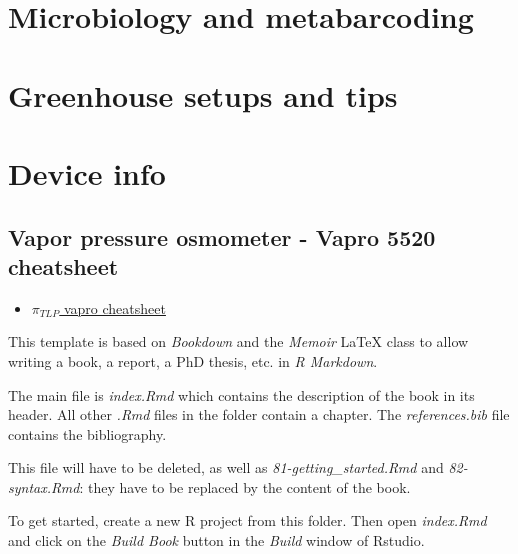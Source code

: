 \documentclass[
  12pt,
  american,
  a4paper,
  extrafontsizes,onecolumn,openright
  ]{memoir}
\makeatletter
\providecommand{\tightlist}{%
  \setlength{\itemsep}{0pt}\setlength{\parskip}{0pt}}
\newcommand{\MemoirChapStyle}{daleif1}
\newcommand{\MemoirPageStyle}{Ruled}
\newlength\widthw %
\newcommand*{\SmallMargins}{
  \setlrmarginsandblock{1.5in}{1.5in}{*}
  \setmarginnotes{0.1in}{0.1in}{0.1in}
 \setulmarginsandblock{1.5in}{1in}{*}
  \checkandfixthelayout
  \ch@ngetext
  \clearpage
  \setlength{\widthw}{\textwidth+\marginparsep+\marginparwidth}
  \footnotesatfoot
  \chapterstyle{\MemoirChapStyle}  %
  \pagestyle{\MemoirPageStyle}
}
\makeatother
\begin{document}
\hypertarget{microbiology-and-metabarcoding}{%
\chapter{Microbiology and metabarcoding}\label{microbiology-and-metabarcoding}}

\hypertarget{greenhouse-setups-and-tips}{%
\chapter{Greenhouse setups and tips}\label{greenhouse-setups-and-tips}}

\hypertarget{device-info}{%
\chapter{Device info}\label{device-info}}

\hypertarget{vapor-pressure-osmometer---vapro-5520-cheatsheet}{%
\section{Vapor pressure osmometer - Vapro 5520 cheatsheet}\label{vapor-pressure-osmometer---vapro-5520-cheatsheet}}

\begin{itemize}
\tightlist
\item
  \href{./document/machine/Vapro\%205520/Vapro_cheatsheet.pdf}{\textbf{\(\pi_{TLP}\)} vapro cheatsheet}
\end{itemize}

This template is based on \emph{Bookdown} and the \emph{Memoir} LaTeX class to allow writing a book, a report, a PhD thesis, etc. in \emph{R Markdown}.

The main file is \emph{index.Rmd} which contains the description of the book in its header. All other \emph{.Rmd} files in the folder contain a chapter.
The \emph{references.bib} file contains the bibliography.

This file will have to be deleted, as well as \emph{81-getting\_started.Rmd} and \emph{82-syntax.Rmd}: they have to be replaced by the content of the book.

To get started, create a new R project from this folder.
Then open \emph{index.Rmd} and click on the \emph{Build Book} button in the \emph{Build} window of Rstudio.



\backmatter
\SmallMargins
\end{document}
